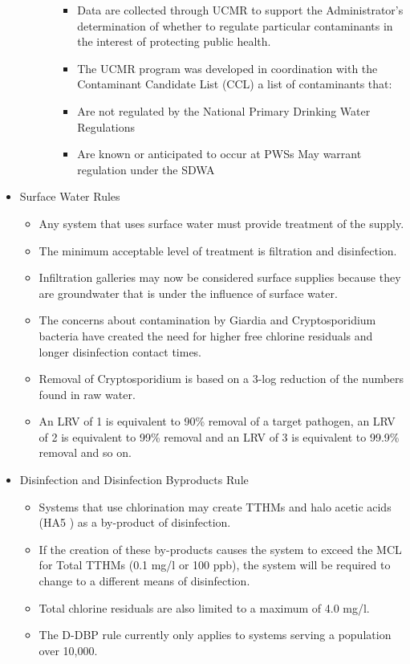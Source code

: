 \begin{itemize}
\begin{itemize}
\begin{enumerate}
\begin{itemize}
\item Data are collected through UCMR to support the Administrator's determination of whether to regulate particular contaminants in the interest of protecting public health.\\

\item The UCMR program was developed in coordination with the Contaminant Candidate List (CCL) a list of contaminants that:

\item Are not regulated by the National Primary Drinking Water Regulations
\item Are known or anticipated to occur at PWSs May warrant regulation under the SDWA
\end{itemize}
\end{enumerate}
\end{itemize}



\item Surface Water Rules
\begin{itemize}
\item Any system that uses surface water must provide treatment of the supply. 
\item The minimum acceptable level of treatment is filtration and disinfection. \item Infiltration galleries may now be considered surface supplies because they are groundwater that is under the influence of surface water.
\item The concerns about contamination by Giardia and Cryptosporidium bacteria have created the need for higher free chlorine residuals and longer disinfection contact times.
\item Removal of Cryptosporidium is based on a 3-log reduction of the numbers found in raw water. 
\item An LRV of 1 is equivalent to 90\% removal of a target pathogen, an LRV of 2 is equivalent to 99\% removal and an LRV of 3 is equivalent to 99.9\% removal and so on.
\end{itemize}

\item Disinfection and Disinfection Byproducts Rule
\begin{itemize}
\item Systems that use chlorination may create TTHMs and halo acetic acids (HA5 ) as a by-product of disinfection.
 
\item If the creation of these by-products causes the system to exceed the MCL for Total TTHMs (0.1 mg/l or 100 ppb), the system will be required to change to a different means of disinfection. 
\item Total chlorine residuals are also limited to a maximum of 4.0 mg/l. 
\item The D-DBP rule currently only applies to systems serving a population over 10,000.


\end{itemize}
\end{itemize}
